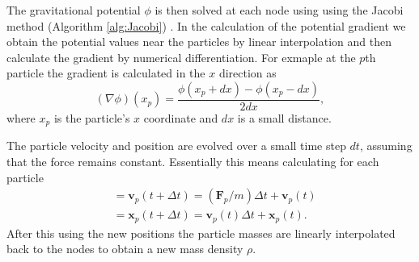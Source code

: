 \documentclass[notitlepage, 12pt]{article}
\begin{document}
The gravitational potential $\phi$ is then solved at each node using using the Jacobi method (Algorithm \ref{alg:Jacobi}) . In the calculation of the potential gradient we obtain the potential values near the particles by linear interpolation and then calculate the gradient by numerical differentiation. For exmaple at the $p$th particle the gradient is calculated in the $x$ direction as
\begin{equation}
(\nabla \phi)(x_p)=\frac{\phi(x_p+dx)-\phi(x_p-dx)}{2dx},
\end{equation}
where $x_p$ is the particle's $x$ coordinate and $dx$ is a small distance.  

The particle velocity and position are evolved over a small time step $dt$, assuming that the force remains constant. Essentially this means calculating for each particle
\begin{align}
&=\mathbf{v}_p(t+\Delta t) = (\mathbf{F}_p/m)\Delta t + \mathbf{v}_p(t)\\
&=\mathbf{x}_p(t+\Delta t) = \mathbf{v}_p(t)\Delta t + \mathbf{x}_p(t).
\end{align}
After this using the new positions the particle masses are linearly interpolated back to the nodes to obtain a new mass density $\rho$.
\end{document}
